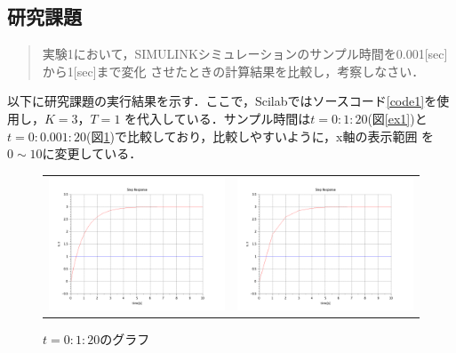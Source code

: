 \documentclass[a4paper,11pt]{jsarticle}
\begin{document}
  \subsection{研究課題}
    \begin{quote}
      実験1において，SIMULINKシミュレーションのサンプル時間を0.001[sec]から1[sec]まで変化
      させたときの計算結果を比較し，考察しなさい．
    \end{quote}
    以下に研究課題の実行結果を示す．ここで，Scilabではソースコード\ref{code1}を使用し，$K=3，T=1$
    を代入している．サンプル時間は$t=0:1:20$(図\ref{ex1})と$t=0:0.001:20$(図\ref{ex2})で比較しており，比較しやすいように，x軸の表示範囲
    を$0\sim 10$に変更している．
    \begin{figure}[H]
      \begin{tabular}{cc}
        \begin{minipage}[t]{0.48\textwidth}
          \centering
          \includegraphics[clip,width=9cm]{picture/ex1.png}
          \caption{$t=0:0.001:20$のグラフ}
          \label{ex1}
        \end{minipage} &
        \begin{minipage}[t]{0.48\textwidth}
          \centering
          \includegraphics[clip,width=9cm]{picture/ex2.png}
          \caption{$t=0:1:20$のグラフ}
          \label{ex2}
        \end{minipage}
      \end{tabular}
    \end{figure}
\end{document}
